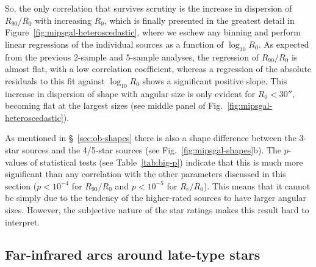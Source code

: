 So, the only correlation that survives scrutiny is the increase in
dispersion of \(R_{90}/R_0\) with increasing \(R_0\), which is finally
presented in the greatest detail in
Figure~\ref{fig:mipsgal-heteroscedastic}, where we eschew any binning
and perform linear regressions of the individual sources as a function
of \(\log_{10} R_0\).  As expected from the previous 2-sample and
5-sample analyses, the regression of \(R_{90}/R_0\) is almost flat,
with a low correlation coefficient, whereas a regression of the
absolute residuals to this fit against \(\log_{10} R_0\) shows a
significant positive slope.  This increase in dispersion of shape with
angular size is only evident for \(R_0 < 30''\), becoming flat at the
largest sizes (see middle panel of
Fig.~\ref{fig:mipsgal-heteroscedastic}).

As mentioned in \S~\ref{sec:ob-shapes} there is also a shape
difference between the 3-star sources and the 4/5-star sources (see
Fig.~\ref{fig:mipsgal-shapes}b).  The \(p\)-values of statistical
tests (see Table~\ref{tab:big-p}) indicate that this is much more
significant than any correlation with the other parameters discussed
in this section (\(p < 10^{-4}\) for \(R_{90}/R_0\) and
\(p < 10^{-5}\) for \(R_c/R_0\)).  This means that it cannot be simply
due to the tendency of the higher-rated sources to have larger angular
sizes.  However, the subjective nature of the star ratings makes this
result hard to interpret.

\subsection{Far-infrared arcs around late-type stars}
\label{sec:far-infrared-arcs}


